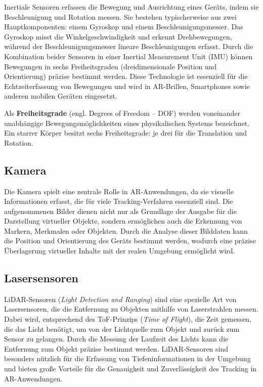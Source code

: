 Inertiale Sensoren erfassen die Bewegung und Ausrichtung eines Geräts, indem sie Beschleunigung und Rotation messen. Sie bestehen typischerweise aus zwei Hauptkomponenten: einem Gyroskop und einem Beschleunigungsmesser. Das Gyroskop misst die Winkelgeschwindigkeit und erkennt Drehbewegungen, während der Beschleunigungsmesser lineare Beschleunigungen erfasst. Durch die Kombination beider Sensoren in einer Inertial Measurement Unit (IMU) können Bewegungen in sechs Freiheitsgraden (dreidimensionale Position und Orientierung) präzise bestimmt werden. Diese Technologie ist essenziell für die Echtzeiterfassung von Bewegungen und wird in AR-Brillen, Smartphones sowie anderen mobilen Geräten eingesetzt. \cite{doerner2022virtual}

\begin{tcolorbox}[colback=THAi-Blue!20!white, colframe=THAi-Blue]
    Als \textbf{Freiheitsgrade} (engl. Degrees of Freedom – DOF) werden voneinander unabhängige Bewegungsmöglichkeiten eines physikalischen Systems bezeichnet. Ein starrer Körper besitzt sechs Freiheitsgrade: je drei für die Translation und Rotation. \cite{wikipedia2024dof}
\end{tcolorbox}  

\subsection{Kamera}

Die Kamera spielt eine zentrale Rolle in AR-Anwendungen, da sie visuelle Informationen erfasst, die für viele Tracking-Verfahren essenziell sind. Die aufgenommenen Bilder dienen nicht nur als Grundlage der Ausgabe für die Darstellung virtueller Objekte, sondern ermöglichen auch die Erkennung von Markern, Merkmalen oder Objekten. Durch die Analyse dieser Bilddaten kann die Position und Orientierung des Geräts bestimmt werden, wodurch eine präzise Überlagerung virtueller Inhalte mit der realen Umgebung ermöglicht wird. \cite{doerner2022virtual}

\subsection{Lasersensoren}\label{LiDAR}

LiDAR-Sensoren (\emph{Light Detection and Ranging}) sind eine spezielle Art von Lasersensoren, die die Entfernung zu Objekten mithilfe von Laserstrahlen messen. Dabei wird, entsprechend des ToF-Prinzips (\emph{Time of Flight}), die Zeit gemessen, die das Licht benötigt, um von der Lichtquelle zum Objekt und zurück zum Sensor zu gelangen. Durch die Messung der Laufzeit des Lichts kann die Entfernung zum Objekt präzise bestimmt werden. LiDAR-Sensoren sind besonders nützlich für die Erfassung von Tiefeninformationen in der Umgebung und bieten große Vorteile für die Genauigkeit und Zuverlässigkeit des Tracking in AR-Anwendungen. \cite{doerner2022virtual, ibm2024lidar}

